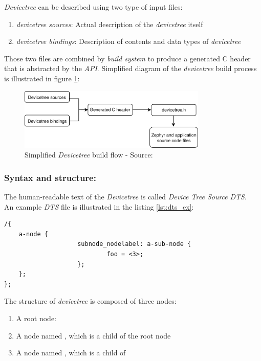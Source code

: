 \documentclass[report.tex]{subfiles}
\begin{document}
\begin{flushleft}
\textit{Devicetree} can be described using two type of input files:
\end{flushleft}
 \begin{enumerate}
 \item \textit{devicetree sources}: Actual description of the \textit{devicetree} itself
 \item \textit{devicetree bindings}: Description of contents and data types of \textit{devicetree}
 \end{enumerate}
 
 Those two files are combined by \textit{build system} to produce a generated C header that is abstracted by the  \textit{API}. Simplified diagram of the \textit{devicetree} build process is illustrated in figure \ref{fig:zephyr_dt_build_flow}:
 
\begin{figure}[H]
	\centering
	\includegraphics[width=0.8\textwidth]{Include/Figure/software/zephyr_dt_build_flow.png}
	\caption{Simplified \textit{Devicetree} build flow - Source:\cite{dtintro}}
	\label{fig:zephyr_dt_build_flow}
\end{figure}


\subsubsection{Syntax and structure:}
The human-readable text of the \textit{Devicetree} is called \textit{Device Tree Source} \textit{DTS}.\\
An example \textit{DTS} file is illustrated in the listing \ref{lst:dts_ex}:
\begin{lstlisting}[style=C,label={lst:dts_ex},caption={Example \textit{DTS} File - Source:\cite{dtintro}}]
/{
	a-node {
					subnode_nodelabel: a-sub-node {
							foo = <3>;
					};
	};
};
\end{lstlisting}
\begin{flushleft}
The structure of \textit{devicetree} is composed of three nodes:
\end{flushleft}
\begin{enumerate}
\item A root node: \codeword{/}
\item A node named , which is a child of the root node
\item A node named , which is a child of 
\end{enumerate}
\;\\[-40pt]
\end{document}
